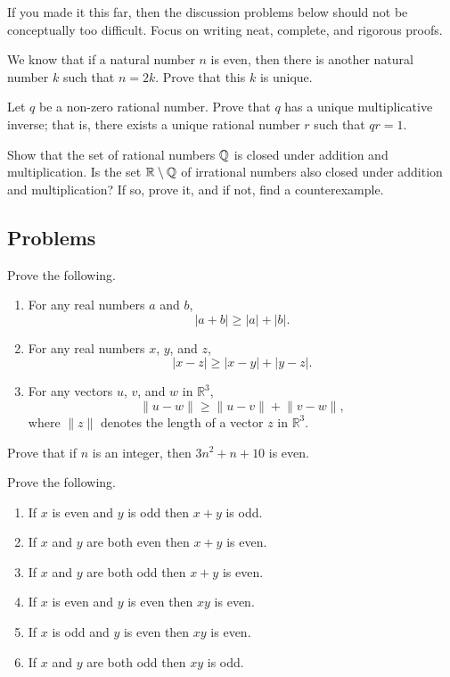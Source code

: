 \documentclass[../main.tex]{subfiles}
\begin{document}
If you made it this far, then the discussion problems below should not be conceptually too difficult. Focus on writing neat, complete, and rigorous proofs.
\begin{exercise}
    We know that if a natural number $n$ is even, then there is another natural number $k$ such that $n = 2k$. Prove that this $k$ is unique.
\end{exercise}
\begin{exercise}
    Let $q$ be a non-zero rational number. Prove that $q$ has a unique multiplicative inverse; that is, there exists a unique rational number $r$ such that $qr = 1$.
\end{exercise}
\begin{exercise}
    Show that the set of rational numbers $\mathbb Q$ is closed under addition and multiplication. Is the set $\mathbb R \setminus \mathbb Q$ of irrational numbers also closed under addition and multiplication? If so, prove it, and if not, find a counterexample.
\end{exercise}

\subsection{Problems}
\begin{homework}
    Prove the following.
    \begin{enumerate}[label=(\alph*)]
        \item For any real numbers $a$ and $b$,
        \[|a+b|\ge|a|+|b|.\]
        \item For any real numbers $x$, $y$, and $z$,
        \[|x-z|\ge|x-y|+|y-z|.\]
        \item For any vectors $u$, $v$, and $w$ in $\mathbb R^3$,
        \[\lVert u-w\rVert\ge\lVert u-v\rVert+\lVert v-w\rVert,\]
        where $\lVert z\rVert$ denotes the length of a vector $z$ in $\mathbb R^3$.
    \end{enumerate}
\end{homework}

\begin{homework}
    Prove that if $n$ is an integer, then $3n^2 + n + 10$ is even.
\end{homework}

\begin{homework}
    Prove the following.
    \begin{enumerate}[label=(\alph*)]
        \item If $x$ is even and $y$ is odd then $x + y$ is odd.
        \item If $x$ and $y$ are both even then $x + y$ is even.
        \item If $x$ and $y$ are both odd then $x + y$ is even.
        \item If $x$ is even and $y$ is even then $xy$ is even.
        \item If $x$ is odd and $y$ is even then $xy$ is even.
        \item If $x$ and $y$ are both odd then $xy$ is odd.
    \end{enumerate}
\end{homework}
\end{document}
